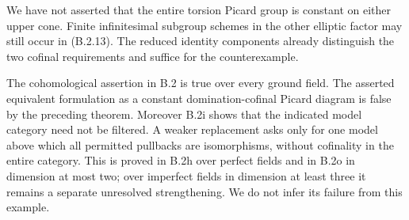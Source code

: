 \begin{remark}[Scope]
We have not asserted that the entire torsion Picard group is
constant on either upper cone.  Finite infinitesimal subgroup
schemes in the other elliptic factor may still occur in
(B.2.13).  The reduced identity components already distinguish
the two cofinal requirements and suffice for the counterexample.
\end{remark}


\begin{remark}
The cohomological assertion in B.2 is true over every ground field.
The asserted equivalent formulation as a constant domination-cofinal
Picard diagram is false by the preceding theorem.  Moreover B.2i shows
that the indicated model category need not be filtered.  A weaker
replacement asks only for one model above which all permitted pullbacks
are isomorphisms, without cofinality in the entire category.  This is
proved in B.2h over perfect fields and in B.2o in dimension at most two;
over imperfect fields in dimension at least three it remains a separate
unresolved strengthening.  We do not infer its failure from this example.
\end{remark}
